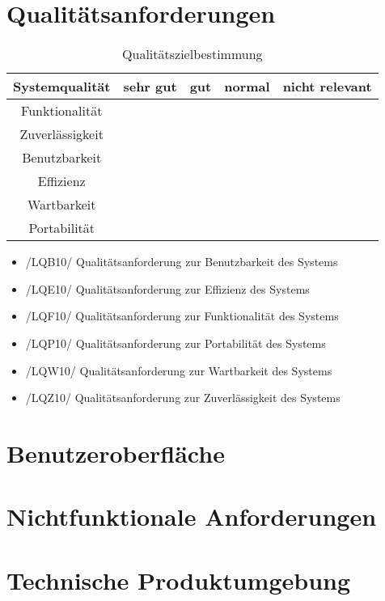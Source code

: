 \documentclass[12pt, a4paper]{article}
\begin{document}
\section{Qualitätsanforderungen}
\newcommand{\xmark}{\ding{55}}%
\begin{table}[h]
	\centering
\begin{tabular}{ || c | c | c | c | c || }
	\hline
	Systemqualität & sehr gut & gut & normal & nicht relevant  \\ \hline
	Funktionalität &  & \xmark &  &  \\ \hline
	Zuverlässigkeit &  & \xmark &  &  \\ \hline
	Benutzbarkeit &  \xmark & &  &  \\ \hline
	Effizienz &  &  & \xmark  &  \\ \hline
	Wartbarkeit &  &  & \xmark &  \\ \hline
	Portabilität &  &  &  & \xmark \\
	\hline
\end{tabular}
\caption{Qualitätszielbestimmung}
\label{table:qualitätsanforderungen}
\end{table}
\begin{itemize}
	\item /LQB10/ Qualitätsanforderung zur Benutzbarkeit des Systems
	\item /LQE10/ Qualitätsanforderung zur Effizienz des Systems
	\item /LQF10/ Qualitätsanforderung zur Funktionalität des Systems
	\item /LQP10/ Qualitätsanforderung zur Portabilität des Systems
	\item /LQW10/ Qualitätsanforderung zur Wartbarkeit des Systems
	\item /LQZ10/ Qualitätsanforderung zur Zuverlässigkeit des Systems
\end{itemize}
\pagebreak

\section{Benutzeroberfläche}
\pagebreak

\section{Nichtfunktionale Anforderungen}
\pagebreak

\section{Technische Produktumgebung}
\end{document}

